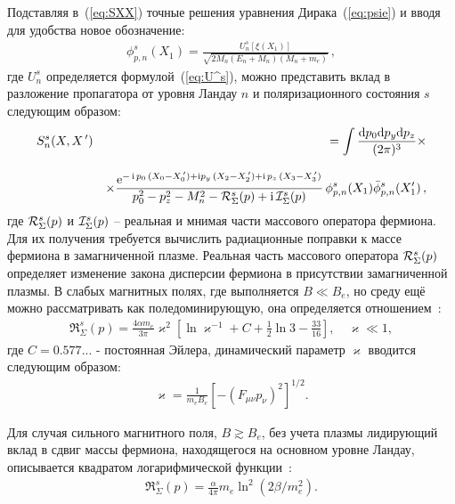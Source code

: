 Подставляя в~(\ref{eq:SXX}) точные решения уравнения Дирака~(\ref{eq:psie}) и вводя для удобства новое обозначение:
\begin{eqnarray}
\phi^{s}_{p, n} (X_1) =   \frac{U^s_{n} [\xi(X_1)]}
{\sqrt{2 M_n (E_{n} + M_n)(M_n + m_e)}} \, ,
\label{eq:phi_psi}
\end{eqnarray}
%
\noindent где $U^s_{n}$ определяется формулой~(\ref{eq:U^s}), можно представить вклад в разложение пропагатора от уровня Ландау $n$ и поляризационного состояния $s$ следующим образом:
\begin{eqnarray}
\label{eq:propagator}
S^{s}_n (X, X^{\,\prime}) && =  \int \frac{\mathrm{d} p_0 \mathrm{d} p_y \mathrm{d} p_z}{(2\pi)^3} \times
\\[3mm]
\nonumber
&& \times \frac{\mathrm{e}^{- \, \mathrm{i} \,  p_0 \,(X_0 - X^{\,\prime}_0) + 
		\mathrm{i} p_y \,(X_2 - X^{\,\prime}_2) +  \mathrm{i} \,  p_z \,(X_3 - X^{\,\prime}_3)}}
{p_0^2 - p_z^2 - M_n^2 - {\cal R}^{s}_\Sigma (p) + \mathrm{i}\, {\cal I}^{s}_\Sigma (p)}
\, \phi^{s}_{p, n} (X_1) \bar \phi^{s}_{p, n} (X'_1) \, ,
\end{eqnarray}
где ${\cal R}^{s}_\Sigma (p)$ и ${\cal I}^{s}_\Sigma (p)$ -- реальная и мнимая части массового оператора фермиона.  Для их получения требуется вычислить радиационные поправки к массе фермиона в замагниченной плазме. Реальная часть массового оператора ${\cal R}^{s}_\Sigma (p)$ определяет изменение закона дисперсии фермиона в присутствии замагниченной плазмы. В слабых магнитных полях, где выполняется $B\ll B_e$, но среду ещё можно рассматривать как поледоминирующую, она определяется 
отношением~\cite{Ritus1969}:
%
\begin{eqnarray}
\label{eq:Re1}
\Re^{s}_\Sigma (p) = \frac{4\alpha m_e}{3\pi} \varkappa^2 \left [ \ln \varkappa^{-1} + C + \frac{1}{2} \ln 3 - \frac{33}{16} \right],\quad \varkappa\ll 1,
\end{eqnarray}
\noindent где $C = 0.577...$ - постоянная Эйлера, динамический параметр $\varkappa$ вводится следующим образом:
%
\begin{eqnarray}
\varkappa = \frac{1}{m_e B_e} [-(F_{\mu\nu} p_{\nu})^2]^{1/2}.
\end{eqnarray}
%

Для случая сильного магнитного поля, $B\gtrsim B_e$, без учета плазмы лидирующий вклад в  сдвиг массы фермиона, находящегося на основном уровне Ландау, описывается квадратом логарифмической функции~\cite{Jancovici:1969}:
\begin{eqnarray}
\label{eq:Re2}
\Re^{s}_\Sigma (p) = \frac{\alpha}{4\pi} m_e \ln^2 (2\beta/m_e^2).
\end{eqnarray}
%

